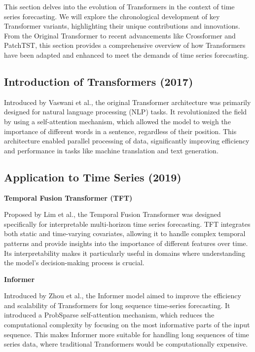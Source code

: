This section delves into the evolution of Transformers in the context of time series forecasting. We will explore the chronological development of key Transformer variants, highlighting their unique contributions and innovations. From the Original Transformer to recent advancements like Crossformer and PatchTST, this section provides a comprehensive overview of how Transformers have been adapted and enhanced to meet the demands of time series forecasting.

\subsection{Introduction of Transformers (2017)}

Introduced by Vaswani et al.\cite{vaswani2023attention}, the original Transformer architecture was primarily designed for natural language processing (NLP) tasks. It revolutionized the field by using a self-attention mechanism, which allowed the model to weigh the importance of different words in a sentence, regardless of their position. This architecture enabled parallel processing of data, significantly improving efficiency and performance in tasks like machine translation and text generation.
\vspace{10pt}


\subsection{Application to Time Series (2019)}
\noindent\textbf
{Temporal Fusion Transformer (TFT)}

\noindent Proposed by Lim et al.\cite{lim2020temporalfusiontransformersinterpretable}, the Temporal Fusion Transformer was designed specifically for interpretable multi-horizon time series forecasting. TFT integrates both static and time-varying covariates, allowing it to handle complex temporal patterns and provide insights into the importance of different features over time. Its interpretability makes it particularly useful in domains where understanding the model’s decision-making process is crucial.
\vspace{10pt}


\noindent\textbf
{Informer}

\noindent Introduced by Zhou et al.\cite{zhou2021informerefficienttransformerlong}, the Informer model aimed to improve the efficiency and scalability of Transformers for long sequence time-series forecasting. It introduced a ProbSparse self-attention mechanism, which reduces the computational complexity by focusing on the most informative parts of the input sequence. This makes Informer more suitable for handling long sequences of time series data, where traditional Transformers would be computationally expensive.
\vspace{10pt}



